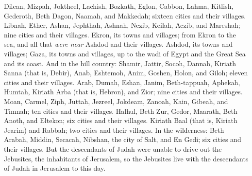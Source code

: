 \begin{biblechapter}
\verse Dilean, Mizpah, Joktheel,
\verse Lachish, Bozkath, Eglon,
\verse Cabbon, Lahma, Kitlish,
\verse Gederoth, Beth Dagon, Naamah, and Makkedah; sixteen cities and their villages.
\verse Libnah, Ether, Ashan,
\verse Jephthah, Ashnah, Nezib,
\verse Keilah, Aczib, and Mareshah; nine cities and their villages.
\verse Ekron, its towns and villages;
\verse from Ekron to the sea, and all that \textit{were near} Ashdod and their villages.
\verse Ashdod, its towns and villages; Gaza, its towns and villages, up to the wadi of Egypt and the Great Sea and its coast.
\verse And in the hill country: Shamir, Jattir, Socoh,
\verse Dannah, Kiriath Sanna (that is, Debir),
\verse Anab, Eshtemoh, Anim,
\verse Goshen, Holon, and Giloh; eleven cities and their villages.
\verse Arab, Dumah, Eshan,
\verse Janim, Beth-tappuah, Aphekah,
\verse Humtah, Kiriath Arba (that is, Hebron), and Zior; nine cities and their villages.
\verse Moan, Carmel, Ziph, Juttah,
\verse Jezreel, Jokdeam, Zanoah,
\verse Kain, Gibeah, and Timnah; ten cities and their villages.
\verse Halhul, Beth Zur, Gedor,
\verse Maarath, Beth Anoth, and Eltekon; six cities and their villages.
\verse Kiriath Baal (that is, Kiriath Jearim) and Rabbah; two cities and their villages.
\verse In the wilderness: Beth Arabah, Middin, Secacah,
\verse Nibshan, the city of Salt, and En Gedi; six cities and their villages.
\verse But the descendants of Judah were unable to drive out the Jebusites, the inhabitants of Jerusalem, so the Jebusites live with the descendants of Judah in Jerusalem to this day.
\end{biblechapter}

